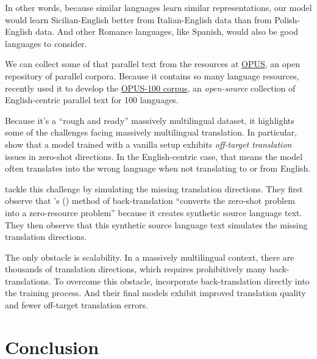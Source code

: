 \documentclass[10pt,letterpaper]{article}
\begin{document}
In other words, because similar languages learn similar representations, our model would learn Sicilian-English 
better from Italian-English data than from Polish-English data.  And other Romance languages, like Spanish, would 
also be good languages to consider.

We can collect some of that parallel text from the resources at 
\href{http://opus.nlpl.eu/}{OPUS}, an open repository of parallel corpora.
Because it contains so many language resources,
\citet{zhang2020improving} recently used it to develop the 
\href{http://opus.nlpl.eu/opus-100.php}{OPUS-100 corpus}, an
\textit{open-source} collection of English-centric parallel text for 100 languages.

Because it's a ``rough and ready'' massively multilingual dataset, it highlights some of the challenges
facing massively multilingual translation.  In particular, \citeauthor{zhang2020improving}
show that a model trained with a vanilla setup exhibits \textit{off-target translation} issues
in zero-shot directions.  In the English-centric case, that means
the model often translates into	the wrong language when not translating to or from English.

\citeauthor{zhang2020improving} tackle this challenge by simulating the missing translation directions.
They first observe that \citeauthor{sennrich2015backtrans}'s (\citeyear{sennrich2015backtrans})
method of back-translation ``converts the zero-shot problem into a zero-resource problem''
because it creates synthetic source language text.  They then observe that this
synthetic source language text simulates the missing translation directions.

The only obstacle is scalability.  In a massively multilingual context, there are thousands of
translation directions, which requires prohibitively many back-translations.  To overcome this obstacle,
\citeauthor{zhang2020improving} incorporate back-translation directly into the training process.
And their final models exhibit improved translation quality and fewer off-target translation errors.



\hypertarget{conclusion}{}

\section*{Conclusion}
\end{document}
